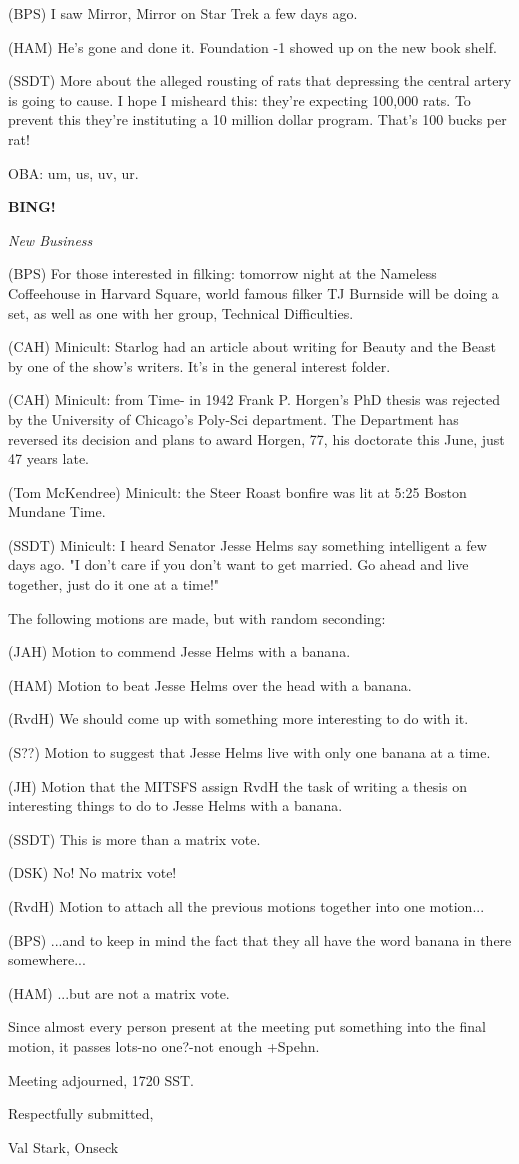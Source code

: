 \documentclass[12pt]{article}
\newcommand{\bing}{{\bf BING!} }
\newcommand{\goto}[1]{\bing \vskip 12pt \centerline{{\em{#1}}}}
\begin{document}
(BPS) I saw Mirror, Mirror on Star Trek a few days ago.

(HAM) He's gone and done it. Foundation -1 showed up on the new book shelf.

(SSDT) More about the alleged rousting of rats that depressing the central artery is going to cause. I hope I misheard this: they're expecting 100,000 rats. To prevent this they're instituting a 10 million dollar program. That's 100 bucks per rat!

OBA: um, us, uv, ur.

\goto{New Business}

(BPS) For those interested in filking: tomorrow night at the Nameless Coffeehouse in Harvard Square, world famous filker TJ Burnside will be doing a set, as well as one with her group, Technical Difficulties.

(CAH) Minicult: Starlog had an article about writing for Beauty and the Beast by one of the show's writers. It's in the general interest folder.

(CAH) Minicult: from Time- in 1942 Frank P. Horgen's PhD thesis was rejected by the University of Chicago's Poly-Sci department. The Department has reversed its decision and plans to award Horgen, 77, his doctorate this June, just 47 years late.

(Tom McKendree) Minicult: the Steer Roast bonfire was lit at 5:25 Boston Mundane Time.

(SSDT) Minicult: I heard Senator Jesse Helms say something intelligent a few days ago. "I don't care if you don't want to get married. Go ahead and live together, just do it one at a time!"

The following motions are made, but with random seconding:

(JAH) Motion to commend Jesse Helms with a banana.

(HAM) Motion to beat Jesse Helms over the head with a banana.

(RvdH) We should come up with something more interesting to do with it.

(S??) Motion to suggest that Jesse Helms live with only one banana at a time.

(JH) Motion that the MITSFS assign RvdH the task of writing a thesis on interesting things to do to Jesse Helms with a banana.

(SSDT) This is more than a matrix vote.

(DSK) No! No matrix vote!

(RvdH) Motion to attach all the previous motions together into one motion...

(BPS) ...and to keep in mind the fact that they all have the word banana in there somewhere...

(HAM) ...but are not a matrix vote.

Since almost every person present at the meeting put something into the final motion, it passes lots-no one?-not enough +Spehn.

\vspace{12pt}

\noindent
Meeting adjourned, 1720 SST.

\vspace{18pt}

\centerline{Respectfully submitted,}
\centerline{Val Stark, Onseck}
\end{document}
